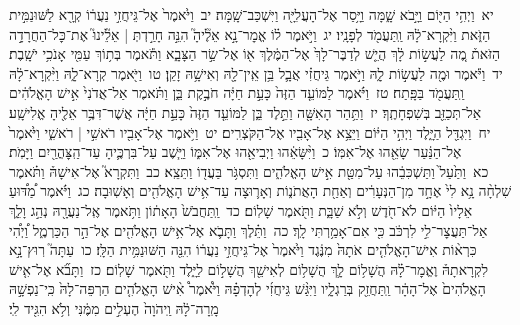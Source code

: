 \documentclass[18pt]{article}
\newcommand{\kri}[1]{\Afootnote{#1}}	%
\begin{document}
 {\loc יא~}וַיְהִ֥י הַיּ֖וֹם וַיָּ֣בֹא שָׁ֑מָּה וַיָּ֥סַר אֶל־הָעֲלִיָּ֖ה וַיִּשְׁכַּב־שָֽׁמָּה׃ \startlock
 {\loc יב~}וַיֹּ֙אמֶר֙ אֶל־גֵּיחֲזִ֣י נַעֲר֔וֹ קְרָ֖א לַשּׁוּנַמִּ֣ית הַזֹּ֑את וַיִּ֨קְרָא־לָ֔הּ וַֽתַּעֲמֹ֖ד לְפָנָֽיו׃ \startlock
 {\loc יג~}וַיֹּ֣אמֶר ל֗וֹ אֱמׇר־נָ֣א אֵלֶ֘יהָ֮ הִנֵּ֣ה חָרַ֣דְתְּ  |  אֵלֵ֘ינוּ֮ אֶת־כׇּל־הַחֲרָדָ֣ה הַזֹּאת֒ מֶ֚ה לַעֲשׂ֣וֹת לָ֔ךְ הֲיֵ֤שׁ לְדַבֶּר־לָךְ֙ אֶל־הַמֶּ֔לֶךְ א֖וֹ אֶל־שַׂ֣ר הַצָּבָ֑א וַתֹּ֕אמֶר בְּת֥וֹךְ עַמִּ֖י אָנֹכִ֥י יֹשָֽׁבֶת׃ \startlock
 {\loc יד~}וַיֹּ֕אמֶר וּמֶ֖ה לַעֲשׂ֣וֹת לָ֑הּ וַיֹּ֣אמֶר גֵּיחֲזִ֗י אֲבָ֛ל בֵּ֥ן אֵֽין־לָ֖הּ וְאִישָׁ֥הּ זָקֵֽן׃ \startlock
 {\loc טו~}וַיֹּ֖אמֶר קְרָא־לָ֑הּ וַיִּ֨קְרָא־לָ֔הּ וַֽתַּעֲמֹ֖ד בַּפָּֽתַח׃ \startlock
 {\loc טז~}וַיֹּ֗אמֶר לַמּוֹעֵ֤ד הַזֶּה֙ כָּעֵ֣ת חַיָּ֔ה  \edtext{(אתי)}{\kri{קרי: אַ֖תְּ}}  חֹבֶ֣קֶת בֵּ֑ן וַתֹּ֗אמֶר אַל־אֲדֹנִי֙ אִ֣ישׁ הָאֱלֹהִ֔ים אַל־תְּכַזֵּ֖ב בְּשִׁפְחָתֶֽךָ׃ \startlock
 {\loc יז~}וַתַּ֥הַר הָאִשָּׁ֖ה וַתֵּ֣לֶד בֵּ֑ן לַמּוֹעֵ֤ד הַזֶּה֙ כָּעֵ֣ת חַיָּ֔ה אֲשֶׁר־דִּבֶּ֥ר אֵלֶ֖יהָ אֱלִישָֽׁע׃ \startlock
 {\loc יח~}וַיִּגְדַּ֖ל הַיָּ֑לֶד וַיְהִ֣י הַיּ֔וֹם וַיֵּצֵ֥א אֶל־אָבִ֖יו אֶל־הַקֹּצְרִֽים׃ \startlock
 {\loc יט~}וַיֹּ֥אמֶר אֶל־אָבִ֖יו רֹאשִׁ֣י  |  רֹאשִׁ֑י וַיֹּ֙אמֶר֙ אֶל־הַנַּ֔עַר שָׂאֵ֖הוּ אֶל־אִמּֽוֹ׃ \startlock
 {\loc כ~}וַיִּ֨שָּׂאֵ֔הוּ וַיְבִיאֵ֖הוּ אֶל־אִמּ֑וֹ וַיֵּ֧שֶׁב עַל־בִּרְכֶּ֛יהָ  עַד־הַֽצׇּהֳרַ֖יִם  וַיָּמֹֽת׃ \startlock
 {\loc כא~}וַתַּ֙עַל֙ וַתַּשְׁכִּבֵ֔הוּ עַל־מִטַּ֖ת אִ֣ישׁ הָאֱלֹהִ֑ים וַתִּסְגֹּ֥ר בַּעֲד֖וֹ וַתֵּצֵֽא׃ \startlock
 {\loc כב~}וַתִּקְרָא֮ אֶל־אִישָׁהּ֒ וַתֹּ֗אמֶר שִׁלְחָ֨ה נָ֥א לִי֙ אֶחָ֣ד מִן־הַנְּעָרִ֔ים וְאַחַ֖ת הָאֲתֹנ֑וֹת וְאָר֛וּצָה עַד־אִ֥ישׁ הָאֱלֹהִ֖ים וְאָשֽׁוּבָה׃ \startlock
 {\loc כג~}וַיֹּ֗אמֶר מַ֠דּ֠וּעַ  \edtext{(אתי)}{\kri{קרי: אַ֣תְּ}}   \edtext{(הלכתי)}{\kri{קרי: הֹלֶ֤כֶת}}  אֵלָיו֙ הַיּ֔וֹם לֹא־חֹ֖דֶשׁ וְלֹ֣א שַׁבָּ֑ת וַתֹּ֖אמֶר שָׁלֽוֹם׃ \startlock
 {\loc כד~}וַֽתַּחֲבֹשׁ֙ הָאָת֔וֹן וַתֹּ֥אמֶר אֶֽל־נַעֲרָ֖הּ נְהַ֣ג וָלֵ֑ךְ אַל־תַּעֲצׇר־לִ֣י לִרְכֹּ֔ב כִּ֖י אִם־אָמַ֥רְתִּי לָֽךְ׃ \startlock
 {\loc כה~}וַתֵּ֗לֶךְ וַתָּבֹ֛א אֶל־אִ֥ישׁ הָאֱלֹהִ֖ים אֶל־הַ֣ר הַכַּרְמֶ֑ל וַ֠יְהִ֠י כִּרְא֨וֹת אִישׁ־הָאֱלֹהִ֤ים אֹתָהּ֙ מִנֶּ֔גֶד וַיֹּ֙אמֶר֙ אֶל־גֵּיחֲזִ֣י נַעֲר֔וֹ הִנֵּ֖ה הַשּׁוּנַמִּ֥ית הַלָּֽז׃ \startlock
 {\loc כו~}עַתָּה֮ רֽוּץ־נָ֣א לִקְרָאתָהּ֒ וֶאֱמׇר־לָ֗הּ הֲשָׁל֥וֹם לָ֛ךְ הֲשָׁל֥וֹם לְאִישֵׁ֖ךְ הֲשָׁל֣וֹם לַיָּ֑לֶד וַתֹּ֖אמֶר שָׁלֽוֹם׃ \startlock
 {\loc כז~}וַתָּבֹ֞א אֶל־אִ֤ישׁ הָאֱלֹהִים֙ אֶל־הָהָ֔ר וַֽתַּחֲזֵ֖ק בְּרַגְלָ֑יו וַיִּגַּ֨שׁ גֵּיחֲזִ֜י לְהׇדְפָ֗הּ וַיֹּ֩אמֶר֩ אִ֨ישׁ הָאֱלֹהִ֤ים הַרְפֵּה־לָהּ֙ כִּֽי־נַפְשָׁ֣הּ מָֽרָה־לָ֔הּ וַֽיהֹוָה֙ הֶעְלִ֣ים מִמֶּ֔נִּי וְלֹ֥א הִגִּ֖יד לִֽי׃ \startlock
\end{document}

